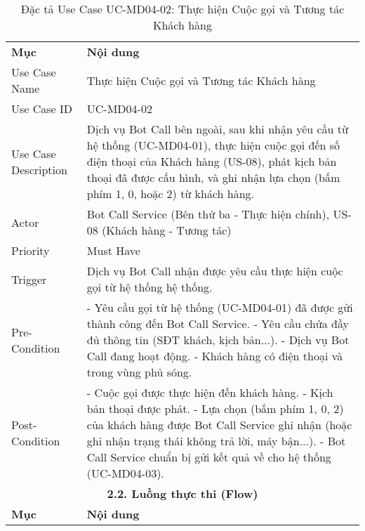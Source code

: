 \begin{longtable}{|m{4cm}|p{11cm}|}
\caption{Đặc tả Use Case UC-MD04-02: Thực hiện Cuộc gọi và Tương tác Khách hàng} \label{tab:uc_md04_02} \\
\hline

\endhead %
\hline
\endfoot %
\hline
\endlastfoot %
\multicolumn{2}{|c|}{\textbf{2.1. Tóm tắt (Summary)}} \\
\hline
\textbf{Mục} & \textbf{Nội dung} \\
\hline
Use Case Name & Thực hiện Cuộc gọi và Tương tác Khách hàng \\
\hline
Use Case ID & UC-MD04-02 \\
\hline
Use Case Description & Dịch vụ Bot Call bên ngoài, sau khi nhận yêu cầu từ hệ thống (UC-MD04-01), thực hiện cuộc gọi đến số điện thoại của Khách hàng (US-08), phát kịch bản thoại đã được cấu hình, và ghi nhận lựa chọn (bấm phím 1, 0, hoặc 2) từ khách hàng. \\
\hline
Actor & Bot Call Service (Bên thứ ba - Thực hiện chính), US-08 (Khách hàng - Tương tác) \\
\hline
Priority & Must Have \\
\hline
Trigger & Dịch vụ Bot Call nhận được yêu cầu thực hiện cuộc gọi từ hệ thống hệ thống. \\
\hline
Pre-Condition & - Yêu cầu gọi từ hệ thống (UC-MD04-01) đã được gửi thành công đến Bot Call Service. \newline - Yêu cầu chứa đầy đủ thông tin (SĐT khách, kịch bản...). \newline - Dịch vụ Bot Call đang hoạt động. \newline - Khách hàng có điện thoại và trong vùng phủ sóng. \\
\hline
Post-Condition & - Cuộc gọi được thực hiện đến khách hàng. \newline - Kịch bản thoại được phát. \newline - Lựa chọn (bấm phím 1, 0, 2) của khách hàng được Bot Call Service ghi nhận (hoặc ghi nhận trạng thái không trả lời, máy bận...). \newline - Bot Call Service chuẩn bị gửi kết quả về cho hệ thống (UC-MD04-03). \\
\hline
\multicolumn{2}{|c|}{\textbf{2.2. Luồng thực thi (Flow)}} \\
\hline
\textbf{Mục} & \textbf{Nội dung} \\
\hline

\end{longtable}
